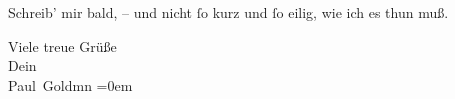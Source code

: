 \pstart
           Schreib’ mir bald, – und nicht{ }ſo kurz und{ }ſo 
               eilig, wie ich es thun muß.\pend
           
\pstart
           Viele treue Grüße {\\[\baselineskip]}Dein {\\[\baselineskip]}\spacefill\mbox{Paul Goldmn}\pend
           \leftskip=0em{}\endnumbering{}  \newcommand{\dateiname}{L03224}\newcommand{\titel}{Paul Goldmann an Arthur Schnitzler, 16. 9. [1902]}\newcommand{\editorInnen}{Martin Anton Müller und Laura Untner}

